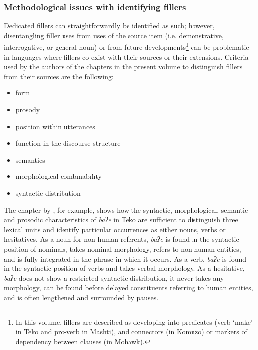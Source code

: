 \documentclass[output=paper]{langscibook}
\begin{document}
\largerpage
\subsubsection{Methodological issues with identifying fillers}\label{sec:intro:9.2.1}
Dedicated fillers can straightforwardly be identified as such; however, disentangling filler uses from uses of the source item (i.e. demonstrative, interrogative, or general noun) or from future developments\footnote{In this volume, fillers are described as developing into predicates (verb ‘make’ in Teko and pro-verb in Mashti), and connectors (in Komnzo) or markers of dependency between clauses (in Mohawk).}  can be problematic in languages where fillers co-exist with their sources or their extensions. Criteria used by the authors of the chapters in the present volume to distinguish fillers from their sources are the following:

\begin{itemize}
\item form
\item prosody
\end{itemize}
\begin{itemize}
\item position within utterances
\item function in the discourse structure
\item semantics
\item morphological combinability
\item syntactic distribution
\end{itemize}

The chapter by \citeauthor{chapters/rose}, for example, shows how the syntactic, morphological, semantic and prosodic characteristics of \textit{baʔe} in Teko are sufficient to distinguish three lexical units and identify particular occurrences as either nouns, verbs or hesitatives. As a noun for non-human referents, \textit{baʔe} is found in the syntactic position of nominals, takes nominal morphology, refers to non-human entities, and is fully integrated in the phrase in which it occurs. As a verb, \textit{baʔe} is found in the syntactic position of verbs and takes verbal morphology. As a hesitative, \textit{baʔe} does not show a restricted syntactic distribution, it never takes any morphology, can be found before delayed constituents referring to human entities, and is often lengthened and surrounded by pauses. 
\end{document}
